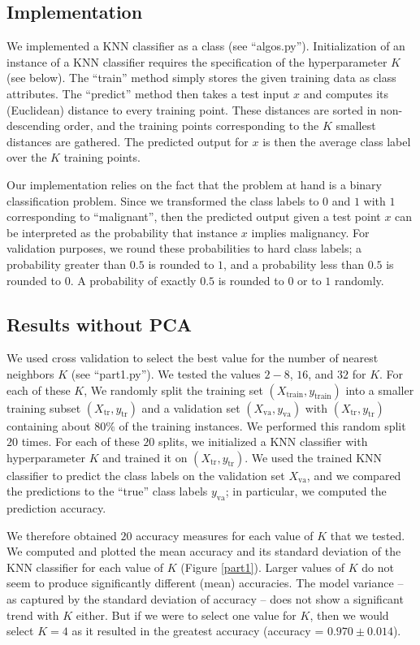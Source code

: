 \documentclass[12pt]{article}
\newcommand{\Xtrain}{X_{\mbox{train}}}
\newcommand{\ytrain}{y_{\mbox{train}}}
\newcommand{\Xtr}{X_{\mbox{tr}}}
\newcommand{\ytr}{y_{\mbox{tr}}}
\newcommand{\Xva}{X_{\mbox{va}}}
\newcommand{\yva}{y_{\mbox{va}}}
\begin{document}
\subsection{Implementation}

We implemented a KNN classifier as a class (see ``algos.py''). Initialization of an instance of a KNN classifier requires the specification of the hyperparameter $K$ (see below). The ``train'' method simply stores the given training data as class attributes. The ``predict'' method then takes a test input $x$ and computes its (Euclidean) distance to every training point. These distances are sorted in non-descending order, and the training points corresponding to the $K$ smallest distances are gathered. The predicted output for $x$ is then the average class label over the $K$ training points.

Our implementation relies on the fact that the problem at hand is a binary classification problem. Since we transformed the class labels to $0$ and $1$ with $1$ corresponding to ``malignant'', then the predicted output given a test point $x$ can be interpreted as the probability that instance $x$ implies malignancy. For validation purposes, we round these probabilities to hard class labels; a probability greater than $0.5$ is rounded to $1$, and a probability less than $0.5$ is rounded to $0$. A probability of exactly $0.5$ is rounded to $0$ or to $1$ randomly.

\subsection{Results without PCA}

We used cross validation to select the best value for the number of nearest neighbors $K$ (see ``part1.py''). We tested the values $2-8$, $16$, and $32$ for $K$. For each of these $K$, We randomly split the training set $(\Xtrain, \ytrain)$ into a smaller training subset $(\Xtr, \ytr)$ and a validation set $(\Xva, \yva)$ with $(\Xtr, \ytr)$ containing about $80\%$ of the training instances. We performed this random split $20$ times. For each of these $20$ splits, we initialized a KNN classifier with hyperparameter $K$ and trained it on $(\Xtr, \ytr)$. We used the trained KNN classifier to predict the class labels on the validation set $\Xva$, and we compared the predictions to the ``true'' class labels $\yva$; in particular, we computed the prediction accuracy.

We therefore obtained $20$ accuracy measures for each value of $K$ that we tested. We computed and plotted the mean accuracy and its standard deviation of the KNN classifier for each value of $K$ (Figure \ref{part1}). Larger values of $K$ do not seem to produce significantly different (mean) accuracies. The model variance -- as captured by the standard deviation of accuracy -- does not show a significant trend with $K$ either. But if we were to select one value for $K$, then we would select $K=4$ as it resulted in the greatest accuracy (accuracy = $0.970\pm 0.014$).
\end{document}
